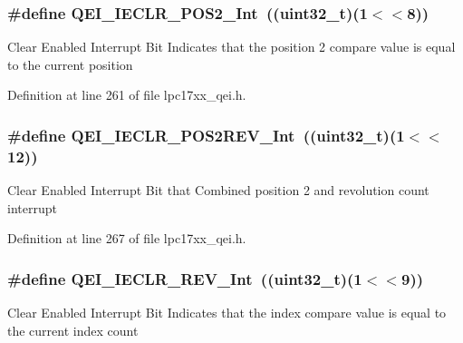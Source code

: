 \hypertarget{group___q_e_i___private___macros_gacef9995d8eba96080ab0170b61498eaf}{
\subsubsection[{\-Q\-E\-I\-\_\-\-I\-E\-C\-L\-R\-\_\-\-P\-O\-S2\-\_\-\-Int}]{\setlength{\rightskip}{0pt plus 5cm}\#define {\bf \-Q\-E\-I\-\_\-\-I\-E\-C\-L\-R\-\_\-\-P\-O\-S2\-\_\-\-Int}~((uint32\-\_\-t)(1$<$$<$8))}}\label{group___q_e_i___private___macros_gacef9995d8eba96080ab0170b61498eaf}
\-Clear \-Enabled \-Interrupt \-Bit \-Indicates that the position 2 compare value is equal to the current position 

\-Definition at line 261 of file lpc17xx\-\_\-qei.\-h.

\hypertarget{group___q_e_i___private___macros_ga516defaad2b488a35e0cc1eb7e4ce64a}{
\subsubsection[{\-Q\-E\-I\-\_\-\-I\-E\-C\-L\-R\-\_\-\-P\-O\-S2\-R\-E\-V\-\_\-\-Int}]{\setlength{\rightskip}{0pt plus 5cm}\#define {\bf \-Q\-E\-I\-\_\-\-I\-E\-C\-L\-R\-\_\-\-P\-O\-S2\-R\-E\-V\-\_\-\-Int}~((uint32\-\_\-t)(1$<$$<$12))}}\label{group___q_e_i___private___macros_ga516defaad2b488a35e0cc1eb7e4ce64a}
\-Clear \-Enabled \-Interrupt \-Bit that \-Combined position 2 and revolution count interrupt 

\-Definition at line 267 of file lpc17xx\-\_\-qei.\-h.

\hypertarget{group___q_e_i___private___macros_ga864164bef68c761cdb7652ede76453da}{
\subsubsection[{\-Q\-E\-I\-\_\-\-I\-E\-C\-L\-R\-\_\-\-R\-E\-V\-\_\-\-Int}]{\setlength{\rightskip}{0pt plus 5cm}\#define {\bf \-Q\-E\-I\-\_\-\-I\-E\-C\-L\-R\-\_\-\-R\-E\-V\-\_\-\-Int}~((uint32\-\_\-t)(1$<$$<$9))}}\label{group___q_e_i___private___macros_ga864164bef68c761cdb7652ede76453da}
\-Clear \-Enabled \-Interrupt \-Bit \-Indicates that the index compare value is equal to the current index count 

